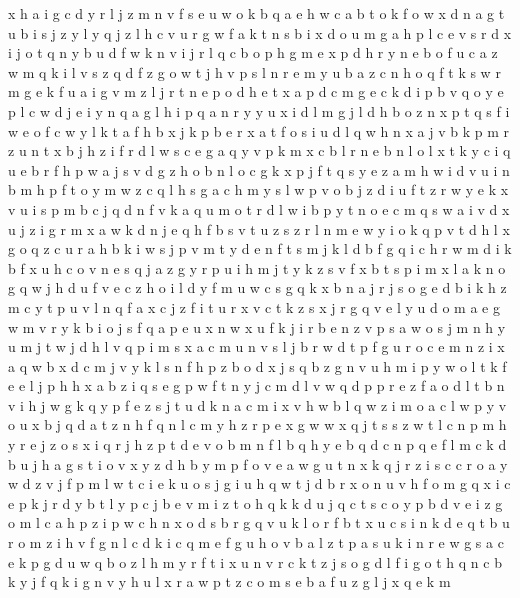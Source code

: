 \documentclass{article}
\begin{document}
x h a i g c d y r l j z m n v f s e u w o k b
q a e
h w c a b t o
k f o w x d n a g t u b i s j z y l
y q j z l h c v u r g w f a k t n s b i x d o
u m g a h p l c e v s r d x i j o t q n y b
u d f w k n v i j r l q c b o p h g m e x
p d h r y n e b o f u c a z w m q k i l v s
z
q d f z g o w t j h v p s l n r e m y u b a
z c n h o q f t k s w r m g
e k f u a i g v m z l j r t n
e p o d h
e t x a p d c
m g e c k d i p b v q o
y e
p l c w d j e i y n q a
g l h i p q a n r y
y u x i d l m
g j l d h b o z n x p t q s f i w e
o f c
w y l k t a f h b x
j k p b e r x a t f o s i u d
l q w h n x a j v b k p m r z
u n t x b j h z i f r d l w s c e g a q y v p k m
x c b l r n e
b n l
o l x t k y c i q u e b r f h p w a j s v d g z
h o
b n l o c g k x p j f t q s y e z a m h w i d v u
i n
b m h
p f t o y m w z c q l h s
g a c h m y s l w p v o b j z d i u
f t z r w y e k x v u i s p m b c j q d n
f v k a q u m o t r d l w i b p
y t n o e c m q s w a i v d x u j
z i g r m x a w k d n j e q h f b s v t u
z s
z r l n m e w y i o k q p v t d h
l x g o q z c u r a h b k i w s j p v m t y d e n f
t s m j k l d b f g q i c h r
w m d i k b f x u h c o v n e s q j a z g y r p
u i h m j t y k z s v f x
b t s p i m x l a k n o g q w j h d u f v e c
z h o i l d y f m u w c s g q k x b n a j
r j s o g e d b i k h z m c y t p u v l n q f a x
c j z f i t u r x v
c t k z s x j r g q v e l y u d o m a
e g w
m v r y k b i o j s f q a p e u x n w
x u f k j i r b e n z v p s a w
o s j m
n h y u m j
t w j d h l v q p i m s x
a c m u n v s l j b r w d t p f
g u r o c e m n z i x a q w b
x d c m j v y k l s n f h p z b o
d x j s q b z g n v u h m i p y w o l t k f e
e l j p h
h x a b z i q s e g p w f t n y j c m d l v
w q d p
p r e z f a o d l t b n v i h j w g k q y
p f e z s j t u d k n a c m i x v h w b l q
w z i m o a c
l w p y v o u x b j q d a t z n h
f q n l c m y h z r p e x g w
w x q j t s
s z w t l c n p m h y r e j
z o
s x i q r j h z p t d e v o b m n
f l b q h y e
b q d c
n p q e f l m c k d b u j h a g s t i o v x y z
d h b y m p f o v e a w g u t n x k q j r z i s c
c r o a y w d z v j f
p m l w t c i e k u o s j
g i u h q w t j d b r x o
n u v h f o m g q x i c e p k j r d y b t l
y p c j b e v m i z t o h q k
k d u j q c t s
c
o y p
b d v e i z g o m l c a
h p z i
p w
c h n x o d s b r g q v u k l
o r f b t x u c s i n k d e q
t b u r o m z i h v f g n l c
d k i c q m e f g u h o v b a l z t p
a s u k i n r e w g
s a c e k p g d u w q b o z l h m y r f t i
x u n v r c k t z j s o g d l f
i g o t h q n c b k y
j f q k i g n v y h u l x r a w p t z c o m s e b
a f u z g l j x q e k m
\end{document}
